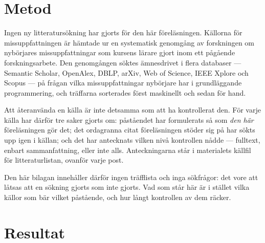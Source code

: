 \section{Metod}
\label{sec:miss-metod-filer}

Ingen ny litteratursökning har gjorts för den här föreläsningen.
Källorna för missuppfattningen är hämtade ur en systematisk genomgång av
forskningen om nybörjares missuppfattningar som kursens lärare gjort
inom ett pågående forskningsarbete\autocite{SooriBosk2026}.  Den
genomgången söktes ämnesdrivet i flera databaser --- Semantic Scholar,
OpenAlex, DBLP, arXiv, Web of Science, IEEE Xplore och Scopus --- på
frågan vilka missuppfattningar nybörjare har i grundläggande
programmering, och träffarna sorterades först maskinellt och sedan för
hand.

Att återanvända en källa är inte detsamma som att ha kontrollerat den.
För varje källa har därför tre saker gjorts om: påståendet har
formulerats så som \emph{den här} föreläsningen gör det; det ordagranna
citat föreläsningen stöder sig på har sökts upp igen i källan; och det
har antecknats vilken nivå kontrollen nådde --- fulltext, enbart
sammanfattning, eller inte alls.  Anteckningarna står i materialets
källfil för litteraturlistan, ovanför varje post.

Den här bilagan innehåller därför ingen träfflista och inga sökfrågor:
det vore att låtsas att en sökning gjorts som inte gjorts.  Vad som står
här är i stället vilka källor som bär vilket påstående, och hur långt
kontrollen av dem räcker.


\section{Resultat}
\label{sec:miss-resultat-filer}

